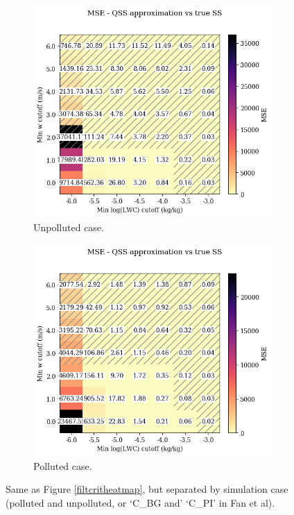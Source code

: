 \documentclass{article}
\begin{document}
\begin{figure}[ht]
	\centering
	\begin{subfigure}{0.7\textwidth}
		\includegraphics[width=\textwidth]{wrf/filtering_criteria_mse_separate_Unpolluted_figure.png}
		\caption{Unpolluted case.}
		\label{filtcritheatmapsepunpoll}
	\end{subfigure}
	\begin{subfigure}{0.7\textwidth}
		\includegraphics[width=\textwidth]{wrf/filtering_criteria_mse_separate_Polluted_figure.png}
		\caption{Polluted case.}
		\label{filtcritheatmapseppoll}
	\end{subfigure}
	\caption{Same as Figure \ref{filtcritheatmap}, but separated by simulation case (polluted and unpolluted, or `C\_BG and' `C\_PI' in Fan et al).}
	\label{filtcritheatmapsep}
\end{figure}
\end{document}
